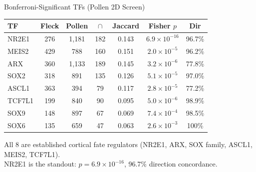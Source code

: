 \documentclass[aspectratio=169,11pt]{beamer}
\begin{document}

\begin{frame}{Bonferroni-Significant TFs (Pollen 2D Screen)}

\begin{table}
\centering
\small
\begin{tabular}{lcccccc}
\toprule
\textbf{TF} & \textbf{Fleck} & \textbf{Pollen} & \textbf{$\cap$} & \textbf{Jaccard} & \textbf{Fisher $p$} & \textbf{Dir} \\
\midrule
\rowcolor{bonfsig!8}
NR2E1 & 276 & 1{,}181 & 182 & 0.143 & $6.9 \times 10^{-16}$ & 96.7\% \\
\rowcolor{bonfsig!8}
MEIS2 & 429 & 788 & 160 & 0.151 & $2.0 \times 10^{-5}$ & 96.2\% \\
\rowcolor{bonfsig!8}
ARX & 360 & 1{,}133 & 189 & 0.145 & $3.2 \times 10^{-6}$ & 77.8\% \\
\rowcolor{bonfsig!8}
SOX2 & 318 & 891 & 135 & 0.126 & $5.1 \times 10^{-5}$ & 97.0\% \\
\rowcolor{bonfsig!8}
ASCL1 & 363 & 394 & 79 & 0.117 & $2.8 \times 10^{-5}$ & 77.2\% \\
\rowcolor{bonfsig!8}
TCF7L1 & 199 & 840 & 90 & 0.095 & $5.0 \times 10^{-6}$ & 98.9\% \\
\rowcolor{bonfsig!8}
SOX9 & 148 & 897 & 67 & 0.069 & $7.4 \times 10^{-4}$ & 98.5\% \\
\rowcolor{bonfsig!8}
SOX6 & 135 & 659 & 47 & 0.063 & $2.6 \times 10^{-3}$ & 100\% \\
\bottomrule
\end{tabular}
\end{table}

\vspace{0.3em}
\centering
\small All 8 are established cortical fate regulators (NR2E1, ARX, SOX family, ASCL1, MEIS2, TCF7L1).\\
NR2E1 is the standout: $p = 6.9 \times 10^{-16}$, 96.7\% direction concordance.

\end{frame}

\end{document}
